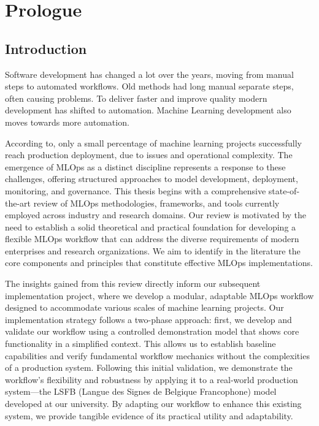 \chapter*{Prologue} %

\section*{Introduction}

Software development has changed a lot over the years, moving from manual steps to automated workflows.
Old methods had long manual separate steps, often causing problems.
To deliver faster and improve quality modern development has shifted to automation.
Machine Learning development also moves towards more automation\cite{Haakman2021}.

According to\cite{10.1145/3533378}, only a small percentage of machine learning projects successfully reach production deployment, due to issues and operational complexity\cite{Haakman2021}.
The emergence of MLOps as a distinct discipline represents a response to these challenges, offering structured approaches to model development, deployment, monitoring, and governance\cite{treveil2020introducing}.
This thesis begins with a comprehensive state-of-the-art review of MLOps methodologies, frameworks, and tools currently employed across industry and research domains.
Our review is motivated by the need to establish a solid theoretical and practical foundation for developing a flexible MLOps workflow that can address the diverse requirements of modern enterprises and research organizations.
We aim to identify in the literature the core components and principles that constitute effective MLOps implementations\cite{DBLP:journals/corr/abs-2103-08942}.

The insights gained from this review directly inform our subsequent implementation project, where we develop a modular, adaptable MLOps workflow designed to accommodate various scales of machine learning projects.
Our implementation strategy follows a two-phase approach: first, we develop and validate our workflow using a controlled demonstration model that shows core functionality in a simplified context.
This allows us to establish baseline capabilities and verify fundamental workflow mechanics without the complexities of a production system.
Following this initial validation, we demonstrate the workflow's flexibility and robustness by applying it to a real-world production system—the LSFB (Langue des Signes de Belgique Francophone) model developed at our university\cite{9534336}.
By adapting our workflow to enhance this existing system, we provide tangible evidence of its practical utility and adaptability.


